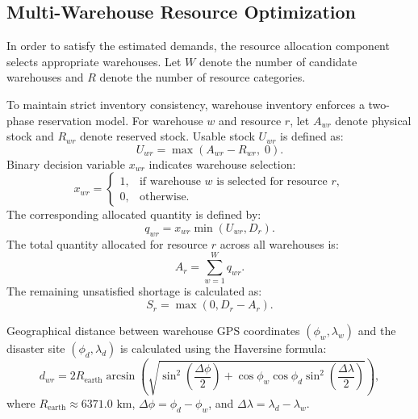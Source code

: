 \documentclass[conference]{IEEEtran}
\begin{document}
\subsection{Multi-Warehouse Resource Optimization}
In order to satisfy the estimated demands, the resource allocation component selects appropriate warehouses. Let $W$ denote the number of candidate warehouses and $R$ denote the number of resource categories. 

To maintain strict inventory consistency, warehouse inventory enforces a two-phase reservation model. For warehouse $w$ and resource $r$, let $A_{wr}$ denote physical stock and $R_{wr}$ denote reserved stock. Usable stock $U_{wr}$ is defined as:
\begin{equation}
U_{wr} = \max(A_{wr} - R_{wr}, \; 0).
\label{eq:usable_stock}
\end{equation}
Binary decision variable $x_{wr}$ indicates warehouse selection:
\begin{equation}
x_{wr} = \begin{cases}
1, & \text{if warehouse } w \text{ is selected for resource } r, \\
0, & \text{otherwise}.
\end{cases}
\label{eq:binary_decision}
\end{equation}
The corresponding allocated quantity is defined by:
\begin{equation}
q_{wr} = x_{wr} \min(U_{wr}, D_r).
\label{eq:allocated_quantity}
\end{equation}
The total quantity allocated for resource $r$ across all warehouses is:
\begin{equation}
A_r = \sum_{w=1}^W q_{wr}.
\label{eq:total_allocated}
\end{equation}
The remaining unsatisfied shortage is calculated as:
\begin{equation}
S_r = \max(0, D_r - A_r).
\label{eq:shortage}
\end{equation}

Geographical distance between warehouse GPS coordinates $(\phi_w, \lambda_w)$ and the disaster site $(\phi_d, \lambda_d)$ is calculated using the Haversine formula:
\begin{equation}
d_{wr} = 2 R_{\text{earth}} \arcsin \left( \sqrt{\sin^2\left(\frac{\Delta \phi}{2}\right) + \cos\phi_w \cos\phi_d \sin^2\left(\frac{\Delta \lambda}{2}\right)} \right),
\label{eq:haversine}
\end{equation}
where $R_{\text{earth}} \approx 6371.0\text{ km}$, $\Delta \phi = \phi_d - \phi_w$, and $\Delta \lambda = \lambda_d - \lambda_w$.
\end{document}
